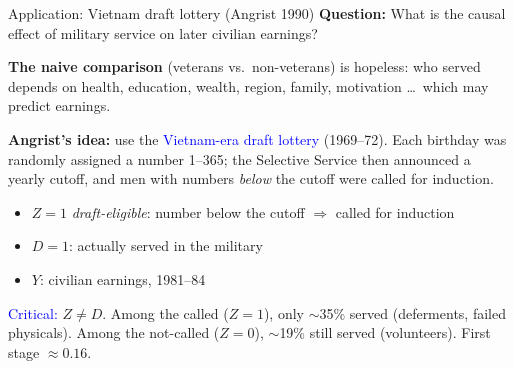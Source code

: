 \documentclass[xcolor=dvipsnames]{beamer}
\begin{document}
\begin{frame}{Application: Vietnam draft lottery (Angrist 1990)}
\small
{} \textbf{Question:} What is the causal effect of military service on later civilian earnings? \\
\medskip

 \textbf{The naive comparison} (veterans vs.\ non-veterans) is hopeless: who served depends on health, education, wealth, region, family, motivation \ldots\ which may predict earnings. \\
\medskip

 \textbf{Angrist's idea:} use the \textcolor{Blue}{Vietnam-era draft lottery} (1969--72). Each birthday was randomly assigned a number 1--365; the Selective Service then announced a yearly cutoff, and men with numbers \textit{below} the cutoff were called for induction.
\smallskip
\begin{itemize}
\item $Z = 1$ \textit{draft-eligible}: number below the cutoff $\Rightarrow$ called for induction
\item $D = 1$: actually served in the military
\item $Y$: civilian earnings, 1981--84
\end{itemize}
\medskip

 \textcolor{Blue}{Critical:} \textit{$Z\neq D$}. Among the called ($Z=1$), only $\sim$35\% served (deferments, failed physicals). Among the not-called ($Z=0$), $\sim$19\% still served (volunteers). First stage $\approx 0.16$.

\end{frame}
\end{document}
